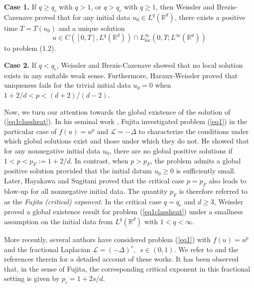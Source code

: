 \documentclass[a4paper,11pt]{amsart}
\renewcommand\eqref[1]{(\ref{#1})} %
\numberwithin{equation}{section}
\theoremstyle{plain}
\theoremstyle{definition}
\begin{document}
\medskip
\noindent \textbf{Case 1.} 
If $q \ge q_c$ with $q>1$, or $q>q_c$ with $q \ge 1$, then Weissler \cite{weissler2} and Brezis-Cazenave \cite{Brezis} proved that for any initial data $u_0 \in L^q(\mathbb{R}^d)$, there exists a positive time $T=T(u_0)$ and a unique solution
\[
u \in C([0,T],L^q(\mathbb{R}^d)) \cap L_{\mathrm{loc}}^{\infty}(0,T;L^{\infty}(\mathbb{R}^d))
\]
to problem (1.2).

\medskip
\noindent \textbf{Case 2.} 
If $q < q_c$, Weissler \cite{weissler2} and Brezis-Cazenave \cite{Brezis} showed that no local solution exists in any suitable weak sense. Furthermore, Haraux-Weissler \cite{HW} proved that uniqueness fails for the trivial initial data $u_0=0$ when $1+2/d < p < (d+2)/(d-2).$

 Now, we turn our attention towards the global existence of the solution of \eqref{eq1classheat}.   In his seminal work \cite{Fujita}, Fujita investigated problem \eqref{eq1} in the particular case of $f(u)=u^p$ and $\mathcal{L}=-\Delta$
to characterize the conditions under which global solutions exist and those under which they do not. He showed that for any nonnegative initial data \(u_0\), there are no global positive solutions if $1<p<p_F:=1+2/d.$ In contrast, when \(p>p_F\), the problem admits a global positive solution provided that the initial datum \(u_0\ge 0\) is sufficiently small. Later, Hayakawa \cite{Hayakawa} and Sugitani \cite{Sugitani} proved that the critical case \(p=p_F\) also leads to blow-up for all nonnegative initial data. The quantity $p_F$ is therefore referred to as the \emph{Fujita (critical) exponent}. In the critical case $q=q_{c}$ and $d \geq 3$, Weissler \cite{weissler3} proved a global existence result for problem \eqref{eq1classheat} under a smallness assumption on the initial data from $L^q(\mathbb{R}^d)$ with $1<q<\infty$.

More recently, several authors have considered problem \eqref{eq1} with \(f(u)=u^p\) and the fractional Laplacian
$
\mathcal{L}=(-\Delta)^s, \,\,\, s\in(0,1).
$
We refer to \cite{Fino, Guedda, Sugitani} and the references therein for a detailed account of these works. It has been observed that, in the sense of Fujita, the corresponding critical exponent in this fractional setting is given by
$p_c=1+2s/d.$
\end{document}
